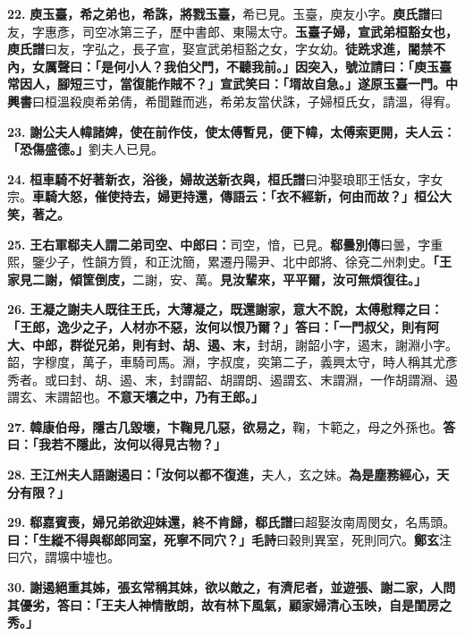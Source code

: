 \textbf{22.} \textbf{庾玉臺，希之弟也，希誅，將戮玉臺，}{\footnotesize 希已見。玉臺，庾友小字。\textbf{庾氏譜}曰友，字惠彥，司空冰第三子，歷中書郎、東陽太守。}\textbf{玉臺子婦，宣武弟桓豁女也，}{\footnotesize \textbf{庾氏譜}曰友，字弘之，長子宣，娶宣武弟桓豁之女，字女幼。}\textbf{徒跣求進，閽禁不內，女厲聲曰：「是何小人？我伯父門，不聽我前。」因突入，號泣請曰：「庾玉臺常因人，腳短三寸，當復能作賊不？」宣武笑曰：「壻故自急。」遂原玉臺一門。}{\footnotesize \textbf{中興書}曰桓溫殺庾希弟倩，希聞難而逃，希弟友當伏誅，子婦桓氏女，請溫，得宥。}

\textbf{23.} \textbf{謝公夫人幃諸婢，使在前作伎，使太傅暫見，便下幃，太傅索更開，夫人云：「恐傷盛德。」}{\footnotesize 劉夫人已見。}

\textbf{24.} \textbf{桓車騎不好著新衣，浴後，婦故送新衣與，}{\footnotesize \textbf{桓氏譜}曰沖娶琅耶王恬女，字女宗。}\textbf{車騎大怒，催使持去，婦更持還，傳語云：「衣不經新，何由而故？」桓公大笑，著之。}

\textbf{25.} \textbf{王右軍郗夫人謂二弟司空、中郎曰：}{\footnotesize 司空，愔，已見。\textbf{郗曇別傳}曰曇，字重熙，鑒少子，性韻方質，和正沈簡，累遷丹陽尹、北中郎將、徐兗二州刺史。}\textbf{「王家見二謝，傾筐倒庋，}{\footnotesize 二謝，安、萬。}\textbf{見汝輩來，平平爾，汝可無煩復往。」}

\textbf{26.} \textbf{王凝之謝夫人既往王氏，大薄凝之，既還謝家，意大不說，太傅慰釋之曰：「王郎，逸少之子，人材亦不惡，汝何以恨乃爾？」答曰：「一門叔父，則有阿大、中郎，群從兄弟，則有封、胡、遏、末，}{\footnotesize 封胡，謝韶小字，遏末，謝淵小字。韶，字穆度，萬子，車騎司馬。淵，字叔度，奕第二子，義興太守，時人稱其尤彥秀者。或曰封、胡、遏、末，封謂韶、胡謂朗、遏謂玄、末謂淵，一作胡謂淵、遏謂玄、末謂韶也。}\textbf{不意天壤之中，乃有王郎。」}

\textbf{27.} \textbf{韓康伯母，隱古几毀壞，卞鞠見几惡，欲易之，}{\footnotesize 鞠，卞範之，母之外孫也。}\textbf{答曰：「我若不隱此，汝何以得見古物？」}

\textbf{28.} \textbf{王江州夫人語謝遏曰：「汝何以都不復進，}{\footnotesize 夫人，玄之妹。}\textbf{為是塵務經心，天分有限？」}

\textbf{29.} \textbf{郗嘉賓喪，婦兄弟欲迎妹還，終不肯歸，}{\footnotesize \textbf{郗氏譜}曰超娶汝南周閔女，名馬頭。}\textbf{曰：「生縱不得與郗郎同室，死寧不同穴？」}{\footnotesize \textbf{毛詩}曰穀則異室，死則同穴。\textbf{鄭玄}注曰穴，謂壙中墟也。}

\textbf{30.} \textbf{謝遏絕重其姊，張玄常稱其妹，欲以敵之，有濟尼者，並遊張、謝二家，人問其優劣，答曰：「王夫人神情散朗，故有林下風氣，顧家婦清心玉映，自是閨房之秀。」}

